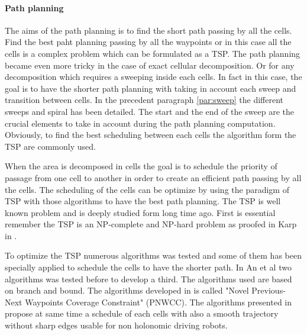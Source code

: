 	
    
 

 
 \paragraph*{Path planning} \label{par:TSPPathPlan}
 
The aims of the path planning is to find the short path passing by all the cells. Find the best paht planning passing by all the waypoints or in this case all the cells is a complex problem  which can be formulated as a TSP. The path planning became even more tricky in the case of exact cellular decomposition. Or for any decomposition which requires a sweeping inside each cells. In fact in this case, the goal is to have the shorter path planning with taking in account each sweep and transition between cells. In the precedent paragraph \ref{par:sweep} the different sweeps and spiral has been detailed. The start and the end of the sweep are the crucial elements to take in account  during the path planning computation.
 Obviously, to find the best scheduling between each cells the algorithm form the TSP are commonly used.     
 
 When the area is decomposed in cells the goal is to schedule the priority of passage from one cell to another in order to create an efficient path passing by all the cells. The scheduling of the cells can be optimize by using the paradigm of TSP with those algorithms to have the best path planning. 
The TSP is well known problem and is deeply studied form long time ago. First is essential remember the TSP is an NP-complete and NP-hard problem as proofed in Karp in \cite{236*karp1972}. 

To optimize the TSP numerous algorithms was tested and some of them has been specially applied to schedule the cells to have the shorter path. In  An et al \cite{60*an2013} two algorithms was tested before to develop a third. The algorithms used are based on branch and bound. The algorithms developed in \cite{60*an2013} is called "Novel Previous-Next Waypoints Coverage Constraint" (PNWCC). The algorithms presented in \cite{60*an2013} propose at same time a schedule of each cells with also a smooth trajectory without sharp edges usable for non holonomic driving robots. 

